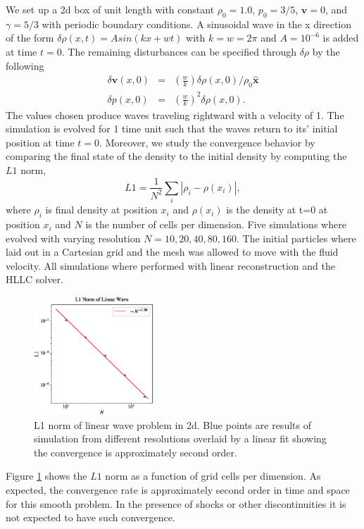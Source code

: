 We set up a 2d box of unit length with constant $\rho_0=1.0$, $p_0=3/5$, $\mathbf{v}=0$,
and $\gamma=5/3$ with periodic boundary conditions. A sinusoidal wave in the x direction of 
the form $\delta\rho(x,t) = Asin(kx + wt)$ with $k=w=2\pi$ and $A=10^{-6}$ is added at time 
$t=0$. The remaining disturbances can be specified through $\delta\rho$ by the following
\begin{equation}
	\begin{array}{rcl}
        \delta \mathbf{v}(x,0) & = & \left(\frac{w}{k}\right)\delta
        	\rho(x,0)/\rho_0\mathbf{\hat{x}}\\
        \delta p(x,0) & = & \left(\frac{w}{k}\right)^2\delta\rho(x,0).
    \end{array}
\end{equation}
The values chosen produce waves traveling rightward with a velocity of 1. The simulation is
evolved for 1 time unit such that the waves return to its' initial position at time $t=0$. 
Moreover, we study the convergence behavior by comparing the final state of the density to 
the initial density by computing the $L1$ norm,
\begin{equation}
	L1 = \frac{1}{N^2}\sum_i \left| \rho_i - \rho(x_i) \right|,
\end{equation}
where $\rho_i$ is final density at position $x_i$ and $\rho(x_i)$ is the density at t=0
at position $x_i$ and $N$ is the number of cells per dimension. Five simulations where evolved
with varying resolution $N=10, 20, 40, 80, 160$. The initial particles where laid out in a
Cartesian grid and the mesh was allowed to move with the fluid velocity. All simulations
where performed with linear reconstruction and the HLLC solver.
\begin{figure}
    \begin{center}
        \includegraphics[width=0.4\textwidth]{figures/linear-wave-l1.eps}
        \caption{L1 norm of linear wave problem in 2d. Blue points are results
        of simulation from different resolutions overlaid by a linear fit showing
        the convergence is approximately second order.}
        \label{fig.linear-wave}
    \end{center}
\end{figure}
Figure \ref{fig.linear-wave} shows the $L1$ norm as a function of grid cells per dimension.
As expected, the convergence rate is approximately second order in time and space for
this smooth problem. In the presence of shocks or other discontinuities it is not expected
to have such convergence.

